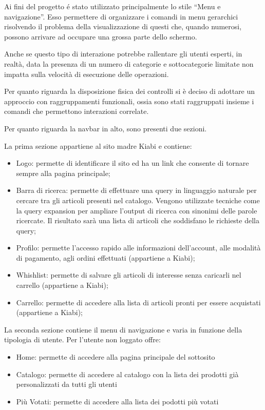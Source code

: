 \documentclass[12pt,italian,]{report}
\providecommand{\tightlist}{%
  \setlength{\itemsep}{0pt}\setlength{\parskip}{0pt}}
\begin{document}
Ai fini del progetto é stato utilizzato principalmente lo stile ``Menu e
navigazione''. Esso permettere di organizzare i comandi in menu
gerarchici risolvendo il problema della visualizzazione di questi che,
quando numerosi, possono arrivare ad occupare una grossa parte dello
schermo.

Anche se questo tipo di interazione potrebbe rallentare gli utenti
esperti, in realtà, data la presenza di un numero di categorie e
sottocategorie limitate non impatta sulla velocità di esecuzione delle
operazioni.

Per quanto riguarda la disposizione fisica dei controlli si è deciso di
adottare un approccio con raggruppamenti funzionali, ossia sono stati
raggruppati insieme i comandi che permettono interazioni correlate.

Per quanto riguarda la navbar in alto, sono presenti due sezioni.

La prima sezione appartiene al sito madre Kiabi e contiene:

\begin{itemize}
\tightlist
\item
  Logo: permette di identificare il sito ed ha un link che consente di
  tornare sempre alla pagina principale;
\item
  Barra di ricerca: permette di effettuare una query in linguaggio
  naturale per cercare tra gli articoli presenti nel catalogo. Vengono
  utilizzate tecniche come la query expansion per ampliare l'output di
  ricerca con sinonimi delle parole ricercate. Il risultato sarà una
  lista di articoli che soddisfano le richieste della query;
\item
  Profilo: permette l'accesso rapido alle informazioni dell'account,
  alle modalità di pagamento, agli ordini effettuati (appartiene a Kiabi);
\item
  Whishlist: permette di salvare gli articoli di interesse senza
  caricarli nel carrello (appartiene a Kiabi);
\item
  Carrello: permette di accedere alla lista di articoli pronti per
  essere acquistati (appartiene a Kiabi);
\end{itemize}

La seconda sezione contiene il menu di navigazione e varia in funzione
della tipologia di utente. Per l'utente non loggato offre:

\begin{itemize}
\tightlist
\item
  Home: permette di accedere alla pagina principale del sottosito
\item
  Catalogo: permette di accedere al catalogo con la lista dei prodotti
  già personalizzati da tutti gli utenti
\item
  Più Votati: permette di accedere alla lista dei podotti più votati
\end{itemize}
\end{document}
